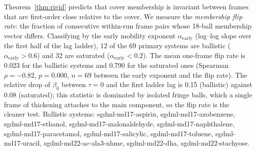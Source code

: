 Theorem~\ref{thm:rigid} predicts that cover membership is invariant between frames that are first-order close relative to the cover. We measure the \emph{membership flip rate}: the fraction of consecutive within-run frame pairs whose 18-ball membership vector differs. Classifying by the early mobility exponent $\alpha_{\mathrm{early}}$ (log--log slope over the first half of the lag ladder), 12 of the 69 primary systems are ballistic ($\alpha_{\mathrm{early}}>0.6$) and 32 are saturated ($\alpha_{\mathrm{early}}<0.2$). The mean one-frame flip rate is 0.023 for the ballistic systems and 0.790 for the saturated ones (Spearman $\rho=-0.82$, $p=0.000$, $n=69$ between the early exponent and the flip rate). The relative drop of $\beta_0$ between $\tau=0$ and the first ladder lag is 0.15 (ballistic) against 0.08 (saturated); this statistic is dominated by isolated fringe balls, which a single frame of thickening attaches to the main component, so the flip rate is the cleaner test. Ballistic systems: sgdml-md17-aspirin, sgdml-md17-azobenzene, sgdml-md17-ethanol, sgdml-md17-malonaldehyde, sgdml-md17-naphthalene, sgdml-md17-paracetamol, sgdml-md17-salicylic, sgdml-md17-toluene, sgdml-md17-uracil, sgdml-md22-ac-ala3-nhme, sgdml-md22-dha, sgdml-md22-stachyose.
